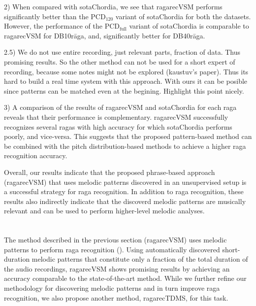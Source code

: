 2) When compared with \acrshort{sotaChordia}, we see that \acrshort{ragarecVSM} performs significantly better than the $\mathrm{PCD}_{120}$ variant of \acrshort{sotaChordia} for both the datasets. However, the performance of the $\mathrm{PCD}_\mathrm{full}$ variant of \acrshort{sotaChordia} is comparable to \acrshort{ragarecVSM} for DB10r\={a}ga, and, significantly better for DB40r\={a}ga. 

2.5) We do not use entire recording, just relevant parts, fraction of data. Thus promising results. So the other method can not be used for a short expert of recording, because some notes might not be explored (kaustuv's paper). Thus its hard to build a real time system with this approach. With ours it can be posible since patterns can be matched even at the begining. Highlight this point nicely.

3) A comparison of the results of \acrshort{ragarecVSM} and \acrshort{sotaChordia} for each \gls{raga} reveals that their performance is complementary. \acrshort{ragarecVSM} successfully recognizes several \glspl{raga} with high accuracy for which \acrshort{sotaChordia} performs poorly, and vice-versa. This suggests that the proposed pattern-based method can be combined with the pitch distribution-based methods to achieve a higher \gls{raga} recognition accuracy.

Overall, our results indicate that the proposed phrase-based approach (\acrshort{ragarecVSM}) that uses melodic patterns discovered in an unsupervised setup is a successful strategy for \gls{raga} recognition. In addition to \gls{raga} recognition, these results also indirectly indicate that the discoverd melodic patterns are musically relevant and can be used to perform higher-level melodic analyses. 


\section{}
\label{sec:tdms_raga_recognition}

The method described in the previous section (\acrshort{ragarecVSM}) uses melodic patterns to perform \gls{raga} recognition (). Using automatically discovered short-duration melodic patterns that constitute only a fraction of the total duration of the audio recordings, \acrshort{ragarecVSM} shows promising results by achieving an accuracy comparable to the state-of-the-art method. While we further refine our methodology for discovering melodic patterns and in turn improve \gls{raga} recognition, we also propose another method, \acrshort{ragarecTDMS}, for this task. 


